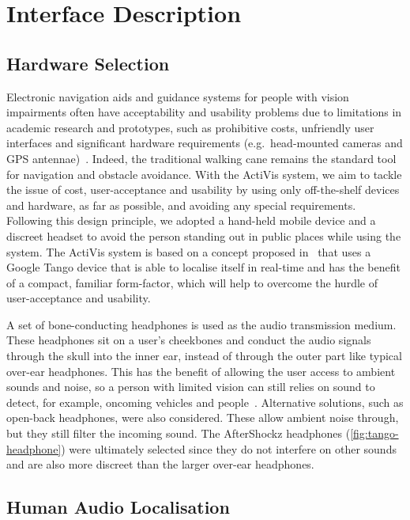 \documentclass{llncs}
\begin{document}
\section{Interface Description}\label{sec:interface-design}

\subsection{Hardware Selection}

Electronic navigation aids and guidance systems for people with vision impairments often have acceptability and usability problems due to limitations in academic research and prototypes, such as prohibitive costs, unfriendly user interfaces and significant hardware requirements (e.g.\ head-mounted cameras and GPS antennae)~\cite{golledge2004stated,yusif2016older,arditi2013user}.
Indeed, the traditional walking cane remains the standard tool for navigation and obstacle avoidance. 
With the ActiVis system, we aim to tackle the issue of cost, user-acceptance and usability by using only off-the-shelf devices and hardware, as far as possible, and avoiding any special requirements.
Following this design principle, we adopted a hand-held mobile device and a discreet headset to avoid the person standing out in public places while using the system.
The ActiVis system is based on a concept proposed in~\cite{lock2017portable,lock2019active} that uses a Google Tango device that is able to localise itself in real-time and has the benefit of a compact, familiar form-factor, which will help to overcome the hurdle of user-acceptance and usability.

A set of bone-conducting headphones is used as the audio transmission medium.
These headphones sit on a user's cheekbones and conduct the audio signals through the skull into the inner ear, instead of through the outer part like typical over-ear headphones. 
This has the benefit of allowing the user access to ambient sounds and noise, so a person with limited vision can still relies on sound to detect, for example, oncoming vehicles and people~\cite{lichtenstein2012headphone}.
Alternative solutions, such as open-back headphones, were also considered. These allow ambient noise through, but they still filter the incoming sound. The AfterShockz headphones (\cref{fig:tango-headphone}) were ultimately selected since they do not interfere on other sounds and are also more discreet than the larger over-ear headphones. 

\subsection{Human Audio Localisation}
\end{document}
